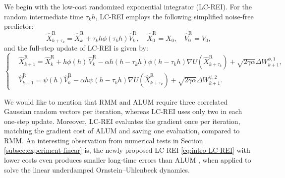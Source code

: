 \documentclass[12pt]{article}
\numberwithin{equation}{section}
\begin{document}
We begin with the low-cost randomized exponential integrator
(LC-REI). For the random intermediate time $\tau_kh$, LC-REI
employs the following simplified noise-free predictor:
\begin{equation}\label{eq:LC-REI-1}
\widehat{X}^{\mathrm{R}}_{k+\tau_k} 
=  
\widehat{X}^{\mathrm{R}}_k 
+ 
\tau_k h\phi(\tau_kh)\widehat{V}^{\mathrm{R}}_k,
\quad 
\widehat{X}^{\mathrm{R}}_{0}
=
X_0,
\quad 
\widehat{V}^{\mathrm{R}}_{0}
=
V_0,
\end{equation}
and the full-step update of LC-REI is given by:
\begin{equation}
\label{eq:M-RSULMC}
\left\{
\begin{aligned}
&
\widehat{X}^{\mathrm{R}}_{k+1} 
=  
\widehat{X}^{\mathrm{R}}_k + h\phi (h)\, \widehat{V}^{\mathrm{R}}_k -
\alpha h
(h-\tau_k h) 
\phi (h-\tau_k h) \nabla U(\widehat{X}^{\mathrm{R}}_{k+\tau_k}) 
+ 
\sqrt{2\gamma\alpha} 
\Delta W_{k+1}^{\phi,1},
\\
&\widehat{V}^{\mathrm{R}}_{k+1} =   \psi(h) \widehat{V}^{\mathrm{R}}_k -\alpha h \psi(h-\tau_k h ) \nabla U (\widehat{X}^{\mathrm{R}}_{k+\tau_k}) +
\sqrt{2\gamma\alpha} 
\Delta W_{k+1}^{\psi,2}.
\end{aligned}
\right.
\end{equation}

We would like to mention that RMM \cite{shen2019randomized,yu2024langevin} and ALUM
\cite{hu2021optimal} require three correlated Gaussian random
vectors per iteration, whereas LC-REI uses only two in each one-step update. Moreover, LC-REI
evaluates the gradient once per iteration, matching the gradient
cost of ALUM and saving one evaluation, compared to RMM.
An interesting observation from numerical tests in Section \ref{subsec:experiment-linear} is, the newly proposed LC-REI \eqref{eq:intro-LC-REI} with lower costs even produces smaller long-time errors than ALUM \cite{hu2021optimal}, when applied to solve the linear underdamped Ornstein--Uhlenbeck dynamics.
%
\end{document}
